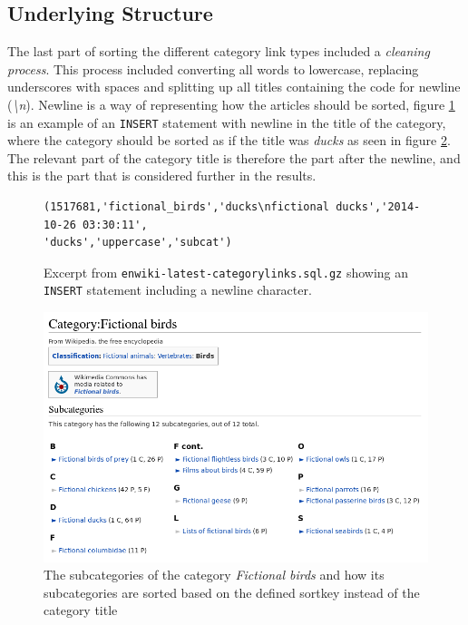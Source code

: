 \subsection{Underlying Structure}
The last part of sorting the different category link types included a \emph{cleaning process}. This process included converting all words to lowercase, replacing underscores with spaces and splitting up all titles containing the code for newline (\emph{\textbackslash n}). Newline is a way of representing how the articles should be sorted, figure \ref{fig:withnewline} is an example of an \texttt{INSERT} statement with newline in the title of the category, where the category should be sorted as if the title was \emph{ducks} as seen in figure \ref{fig:fictionalbirds}. The relevant part of the category title is therefore the part after the newline, and this is the part that is considered further in the results. 



\begin{figure}[h]
\begin{lstlisting}
(1517681,'fictional_birds','ducks\nfictional ducks','2014-10-26 03:30:11',
'ducks','uppercase','subcat')
\end{lstlisting}
\caption[\texttt{INSERT} statement with newline]{Excerpt from \texttt{enwiki-latest-categorylinks.sql.gz} showing an \texttt{INSERT} statement including a newline character. }
\label{fig:withnewline}
\end{figure}

\begin{figure}[h]
\centering
\includegraphics[width=\textwidth]{Chapters/Implementation/Fictional_birds_2}
\caption{The subcategories of the category \emph{Fictional birds} and how its subcategories are sorted based on the defined sortkey instead of the category title }
\label{fig:fictionalbirds}
\end{figure}

